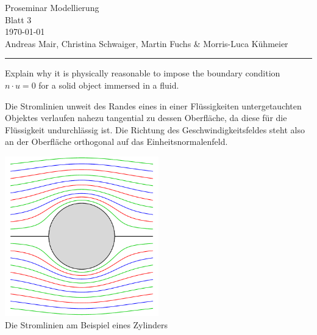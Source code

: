 \documentclass[12pt]{exam}
\begin{document}
\begingroup  
    \centering
    \Large Proseminar Modellierung\\
    \Large Blatt 3\\[0.75em]
    \large \today\\[0.75em]
    \normalsize Andreas Mair, Christina Schwaiger, Martin Fuchs \& Morris-Luca Kühmeier\par
\endgroup

\vspace{12pt}
\hrule
\vspace{12pt}

\printanswers
\renewcommand{\solutiontitle}{\textbf{Lösung:}\enspace}

\thispagestyle{plain}

\begin{questions}

    \question Explain why it is physically reasonable to impose the boundary condition $n \cdot u = 0$ for a solid object immersed in a fluid.
    
    \begin{solution}
        Die Stromlinien unweit des Randes eines in einer Flüssigkeiten untergetauchten Objektes verlaufen nahezu tangential zu dessen Oberfläche, da diese für die Flüssigkeit undurchlässig ist. Die Richtung des Geschwindigkeitsfeldes steht also an der Oberfläche orthogonal auf das Einheitsnormalenfeld.

        \centering
        \includegraphics[width=0.5\textwidth]{LaminarFlow.pdf}\\
        Die Stromlinien am Beispiel eines Zylinders
    \end{solution}
    

\end{questions}
\end{document}
